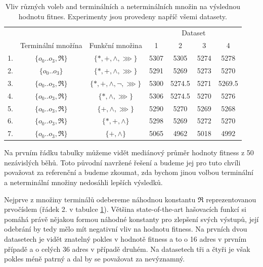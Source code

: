 \begin{table}[h]
	\centering
	\caption{Vliv různých voleb and terminálních a neterminálních množin na výslednou hodnotu fitnes. Experimenty jsou provedeny
		napříč všemi datasety.}
	\begin{tabular}{lcccccc} \\ \hline
		   & & & \multicolumn{4}{c}{Dataset} \\
		   & Terminální množína & Funkční množina & 1 & 2 & 3 & 4 \\ \hline
		1. & $\{o_{0} .. o_{3}, \Re \}$ & $\{*, +, \wedge, \ggg\}$         & 5307 & 5305     & 5274 & 5278 \\
		2. & $\{o_{0} .. o_{3}\}$ & $\{*, +, \wedge, \ggg\}$                  & 5291 & 5269    & 5273 & 5270  \\
		3. & $\{o_{0} .. o_{3}, \Re \}$ & $\{*, +, \wedge, \neg, \ggg\}$ & 5300 & 5274.5 & 5271 &  5269.5 \\
		4. & $\{o_{0} .. o_{3}, \Re \}$ & $\{*, \wedge, \ggg\}$              & 5306 & 5274.5 & 5270 & 5276 \\
		5. & $\{o_{0} .. o_{3}, \Re \}$ & $\{+, \wedge, \ggg\}$ 			   & 5290 & 5270    & 5269  & 5268 \\
		6. & $\{o_{0} .. o_{3}, \Re \}$ & $\{*, +, \wedge\}$                   & 5298 & 5269    & 5272 & 5270 \\
		7. & $\{o_{0} .. o_{3}, \Re \}$ & $\{+, \wedge\}$                      & 5065 & 4962     & 5018 & 4992 \\
		\hline
	\end{tabular}
	\label{tab:basicRunAlternatives1}
\end{table}

Na prvním řádku tabulky můžeme vidět mediánový průměr hodnoty fitness z 50 nezávislých běhů. Toto původní
navržené řešení a budeme jej pro tuto chvíli považovat za referenční a budeme zkoumat, zda bychom jinou
volbou terminální a neterminální množiny nedosáhli lepších výsledků. 

Nejprve z množiny terminálů odebereme náhodnou konstantu $\Re$ reprezentovanou prvočíslem (řádek 2. v tabulce
\ref{tab:basicRunAlternatives1}).
Většina state-of-the-art
hašovacích funkcí si pomáhá právě nějakou formou náhodné konstanty pro zlepšení svých výstupů, její odebrání by tedy
mělo mít negativní vliv na hodnotu fitness. Na prvních dvou
datasetech je vidět znatelný pokles v hodnotě fitness a to o 16 adres v prvním případě a o celých 36 adres
v případě druhém. Na datasetech tři a čtyři je však pokles méně patrný a dal by se považovat za nevýznamný.

